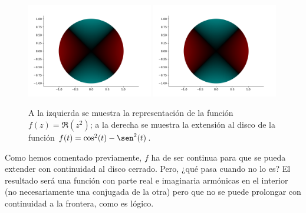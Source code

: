 \begin{figure}[H]
    \centering
    \includegraphics[width=0.49\textwidth]{../Aplicacion/z^2(3).png}
    \hfill
    \includegraphics[width=0.49\textwidth]{../Aplicacion/cos^2(t)-sen^2(t).png}
    \caption{A la izquierda se muestra la representación de la función $f(z) = \Re (z^2)$; a la derecha se muestra la extensión al disco de la función $f(t) = \cos^2(t) - \sen^2(t)$.}
    \label{fig:comparacion4}
\end{figure}

Como hemos comentado previamente, $f$ ha de ser continua para que se pueda extender con continuidad al disco cerrado. Pero, ¿qué pasa cuando no lo es? El resultado será una función con parte real e imaginaria armónicas en el interior (no necesariamente una conjugada de la otra) pero que no se puede prolongar con continuidad a la frontera, como es lógico. \\ %

